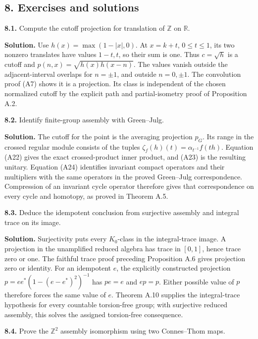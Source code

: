 \documentclass[
  11pt,
]{article}
\begin{document}
\subsection{8. Exercises and solutions}\label{exercises-and-solutions}

\textbf{8.1.} Compute the cutoff projection for translation of
\(\mathbb Z\) on \(\mathbb R\).

\textbf{Solution.} Use \(h(x)=\max(1-|x|,0)\). At \(x=k+t\),
\(0\leq t\leq1\), its two nonzero translates have values \(1-t,t\), so
their sum is one. Thus \(c=\sqrt h\) is a cutoff and
\(p(n,x)=\sqrt{h(x)h(x-n)}\). The values vanish outside the
adjacent-interval overlaps for \(n=\pm1\), and outside \(n=0,\pm1\). The
convolution proof (A7) shows it is a projection. Its class is
independent of the chosen normalized cutoff by the explicit path and
partial-isometry proof of Proposition A.2.

\textbf{8.2.} Identify finite-group assembly with Green--Julg.

\textbf{Solution.} The cutoff for the point is the averaging projection
\(p_G\). Its range in the crossed regular module consists of the tuples
\(\zeta_f(h)(t)=\alpha_{t^{-1}}f(th)\). Equation (A22) gives the exact
crossed-product inner product, and (A23) is the resulting unitary.
Equation (A24) identifies invariant compact operators and their
multipliers with the same operators in the proved Green--Julg
correspondence. Compression of an invariant cycle operator therefore
gives that correspondence on every cycle and homotopy, as proved in
Theorem A.5.

\textbf{8.3.} Deduce the idempotent conclusion from surjective assembly
and integral trace on its image.

\textbf{Solution.} Surjectivity puts every \(K_0\)-class in the
integral-trace image. A projection in the unamplified reduced algebra
has trace in \([0,1]\), hence trace zero or one. The faithful trace
proof preceding Proposition A.6 gives projection zero or identity. For
an idempotent \(e\), the explicitly constructed projection
\(p=ee^*(1-(e-e^*)^2)^{-1}\) has \(pe=e\) and \(ep=p\). Either possible
value of \(p\) therefore forces the same value of \(e\). Theorem A.10
supplies the integral-trace hypothesis for every countable torsion-free
group; with surjective reduced assembly, this solves the assigned
torsion-free consequence.

\textbf{8.4.} Prove the \(\mathbb Z^2\) assembly isomorphism using two
Connes--Thom maps.
\end{document}

